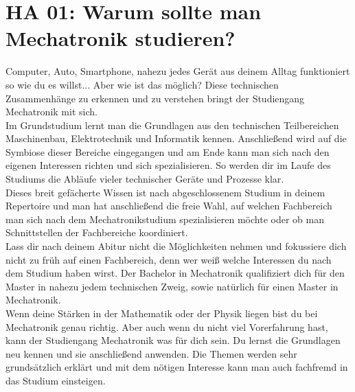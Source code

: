 \chapter{HA 01: Warum sollte man Mechatronik studieren?}
Computer, Auto, Smartphone, nahezu jedes Gerät aus deinem Alltag funktioniert so wie du es willst... Aber wie ist das möglich? Diese technischen Zusammenhänge zu erkennen und zu verstehen bringt der Studiengang Mechatronik mit sich.\\
Im Grundstudium lernt man die Grundlagen aus den technischen Teilbereichen Maschinenbau, Elektrotechnik und Informatik kennen. Anschließend wird auf die Symbiose dieser Bereiche eingegangen und am Ende kann man sich nach den eigenen Interessen richten und sich spezialisieren. So werden dir im Laufe des Studiums die Abläufe vieler technischer Geräte und Prozesse klar.\\
Dieses breit gefächerte Wissen ist nach abgeschlossenem Studium in deinem Repertoire und man hat anschließend die freie Wahl, auf welchen Fachbereich man sich nach dem Mechatronikstudium spezialisieren möchte oder ob man Schnittstellen der Fachbereiche koordiniert.\\
Lass dir nach deinem Abitur nicht die Möglichkeiten nehmen und fokussiere dich nicht zu früh auf einen Fachbereich, denn wer weiß welche Interessen du nach dem Studium haben wirst. Der Bachelor in Mechatronik qualifiziert dich für den Master in nahezu jedem technischen Zweig, sowie natürlich für einen Master in Mechatronik.\\
Wenn deine Stärken in der Mathematik oder der Physik liegen bist du bei Mechatronik genau richtig. Aber auch wenn du nicht viel Vorerfahrung hast, kann der Studiengang Mechatronik was für dich sein. Du lernst die Grundlagen neu kennen und sie anschließend anwenden. Die Themen werden sehr grundsätzlich erklärt und mit dem nötigen Interesse kann man auch fachfremd in das Studium einsteigen.

